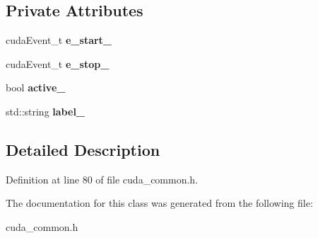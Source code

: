 \subsection*{Private Attributes}
\begin{DoxyCompactItemize}
\item 
\hypertarget{class_c_u_d_a__timer_a7996dbd8adc0e1c9337c6fd9649ce213}{}cuda\+Event\+\_\+t {\bfseries e\+\_\+start\+\_\+}\label{class_c_u_d_a__timer_a7996dbd8adc0e1c9337c6fd9649ce213}

\item 
\hypertarget{class_c_u_d_a__timer_acd41dc09cc4aba82d53ea836ca978d0d}{}cuda\+Event\+\_\+t {\bfseries e\+\_\+stop\+\_\+}\label{class_c_u_d_a__timer_acd41dc09cc4aba82d53ea836ca978d0d}

\item 
\hypertarget{class_c_u_d_a__timer_a8cb35b09ebc3e6edb73255be411e250b}{}bool {\bfseries active\+\_\+}\label{class_c_u_d_a__timer_a8cb35b09ebc3e6edb73255be411e250b}

\item 
\hypertarget{class_c_u_d_a__timer_aaf2190336cb2e8f2ac077f5668f41552}{}std\+::string {\bfseries label\+\_\+}\label{class_c_u_d_a__timer_aaf2190336cb2e8f2ac077f5668f41552}

\end{DoxyCompactItemize}


\subsection{Detailed Description}


Definition at line 80 of file cuda\+\_\+common.\+h.



The documentation for this class was generated from the following file\+:\begin{DoxyCompactItemize}
\item 
cuda\+\_\+common.\+h\end{DoxyCompactItemize}
